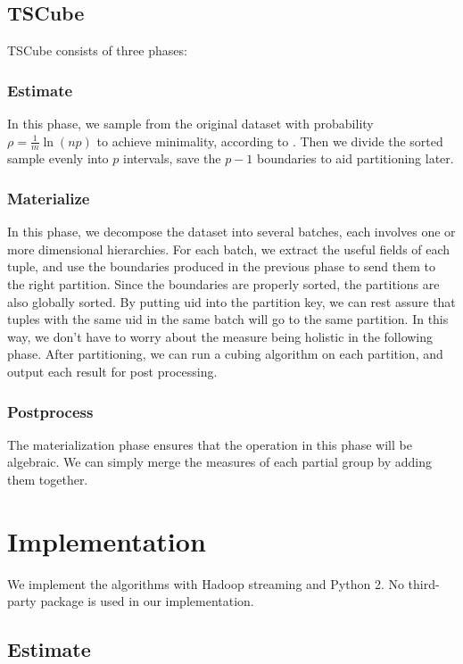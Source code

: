 \documentclass{article}
\begin{document}
\subsection{TSCube}

TSCube consists of three phases:

\subsubsection{Estimate}
In this phase, we sample from the original dataset with probability $\rho=\frac{1}{m}\ln(np)$ to achieve minimality, according to \cite{tao2013minimal}. Then we divide the sorted sample evenly into $p$ intervals, save the $p - 1$ boundaries to aid partitioning later.

\subsubsection{Materialize}
In this phase, we decompose the dataset into several batches, each involves one or more dimensional hierarchies. For each batch, we extract the useful fields of each tuple, and use the boundaries produced in the previous phase to send them to the right partition. Since the boundaries are properly sorted, the partitions are also globally sorted. By putting uid into the partition key, we can rest assure that tuples with the same uid in the same batch will go to the same partition. In this way, we don't have to worry about the measure being holistic in the following phase. After partitioning, we can run a cubing algorithm on each partition, and output each result for post processing.

\subsubsection{Postprocess}
The materialization phase ensures that the operation in this phase will be algebraic. We can simply merge the measures of each partial group by adding them together.

\section{Implementation}

We implement the algorithms with Hadoop streaming and Python 2. No third-party package is used in our implementation.

\subsection{Estimate}
\end{document}

